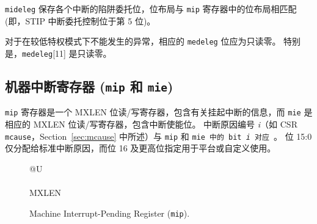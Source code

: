 \iffalse
{\tt mideleg} holds trap delegation bits for individual interrupts, with the
layout of bits matching those in the {\tt mip} register (i.e., STIP interrupt
delegation control is located in bit 5).

For exceptions that cannot occur in less privileged modes, the corresponding
{\tt medeleg} bits should be read-only zero.  In particular,
{\tt medeleg}[11] is read-only zero.
\fi

{\tt mideleg} 保存各个中断的陷阱委托位，位布局与 {\tt mip} 寄存器中的位布局相匹配(即，STIP 中断委托控制位于第 5 位)。

对于在较低特权模式下不能发生的异常，相应的 {\tt medeleg} 位应为只读零。 特别是，{\tt medeleg}[11] 是只读零。

\subsection{机器中断寄存器 ({\tt mip} 和 {\tt mie})}

\iffalse
The {\tt mip} register is an MXLEN-bit read/write register containing
information on pending interrupts, while {\tt mie} is the
corresponding MXLEN-bit read/write register containing interrupt enable
bits.
Interrupt cause number \textit{i} (as reported in CSR {\tt mcause},
Section~\ref{sec:mcause}) corresponds with bit~\textit{i} in both
{\tt mip} and {\tt mie}.
Bits 15:0 are allocated to standard interrupt causes only, while bits 16
and above are designated for platform or custom use.
\fi

{\tt mip} 寄存器是一个 MXLEN 位读/写寄存器，包含有关挂起中断的信息，而 {\tt mie} 是相应的 MXLEN 位读/写寄存器，包含中断使能位。 中断原因编号 \textit{i}（如 CSR {\tt mcause}，Section~\ref{sec:mcause} 中所述）与 {\tt mip} 和 {\tt mie 中的 bit~\textit{i} 对应 }。 位 15:0 仅分配给标准中断原因，而位 16 及更高位指定用于平台或自定义使用。

\begin{figure}[h!]
{\footnotesize
\begin{center}
\begin{tabular}{@{}U}
 \\
\hline
{} \\
\hline
MXLEN \\
\end{tabular}
\end{center}
}
\vspace{-0.1in}
\caption{Machine Interrupt-Pending Register ({\tt mip}).}
\label{mipreg}
\end{figure}

